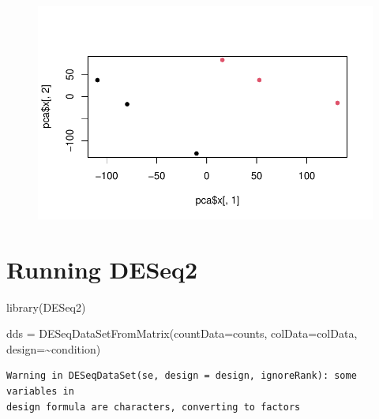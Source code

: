 \documentclass[
  letterpaper,
  DIV=11,
  numbers=noendperiod]{scrartcl}
\newenvironment{Shaded}{\begin{snugshade}}{\end{snugshade}}
\newcommand{\AttributeTok}[1]{\textcolor[rgb]{0.40,0.45,0.13}{#1}}
\newcommand{\FunctionTok}[1]{\textcolor[rgb]{0.28,0.35,0.67}{#1}}
\newcommand{\NormalTok}[1]{\textcolor[rgb]{0.00,0.23,0.31}{#1}}
\newcommand{\OtherTok}[1]{\textcolor[rgb]{0.00,0.23,0.31}{#1}}
\newcommand{\SpecialCharTok}[1]{\textcolor[rgb]{0.37,0.37,0.37}{#1}}
\begin{document}
\begin{figure}[H]

{\centering \includegraphics{Class13_files/figure-pdf/unnamed-chunk-7-1.pdf}

}

\end{figure}

\hypertarget{running-deseq2}{%
\section{Running DESeq2}\label{running-deseq2}}

\begin{Shaded}
\begin{Highlighting}[]
\FunctionTok{library}\NormalTok{(DESeq2)}
\end{Highlighting}
\end{Shaded}

\begin{Shaded}
\begin{Highlighting}[]
\NormalTok{dds }\OtherTok{=} \FunctionTok{DESeqDataSetFromMatrix}\NormalTok{(}\AttributeTok{countData=}\NormalTok{counts,}
                             \AttributeTok{colData=}\NormalTok{colData,}
                             \AttributeTok{design=}\SpecialCharTok{\textasciitilde{}}\NormalTok{condition)}
\end{Highlighting}
\end{Shaded}

\begin{verbatim}
Warning in DESeqDataSet(se, design = design, ignoreRank): some variables in
design formula are characters, converting to factors
\end{verbatim}
\end{document}
